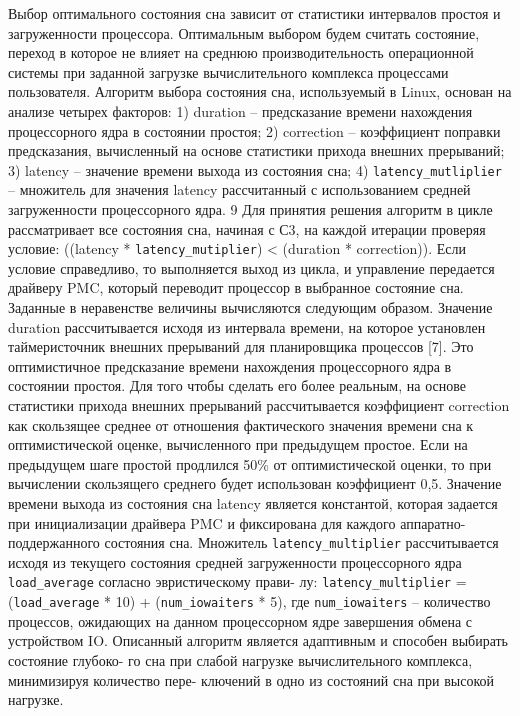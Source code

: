 \documentclass{article}
\begin{document}
Выбор оптимального состояния сна зависит от статистики интервалов простоя и загруженности процессора. Оптимальным выбором будем считать состояние, переход в которое не влияет на среднюю производительность операционной системы при заданной загрузке вычислительного комплекса процессами пользователя.
Алгоритм выбора состояния сна, используемый в Linux, основан на анализе четырех
факторов:
1) duration – предсказание времени нахождения процессорного ядра в состоянии
простоя;
2) correction – коэффициент поправки предсказания, вычисленный на основе статистики прихода внешних прерываний;
3) latency – значение времени выхода из состояния сна;
4) \texttt{latency\_mutliplier} – множитель для значения latency рассчитанный с использованием средней загруженности процессорного ядра.
9
Для принятия решения алгоритм в цикле рассматривает все состояния сна, начиная с
С3, на каждой итерации проверяя условие:
((latency * \texttt{latency\_mutiplier}) < (duration * correction)).
Если условие справедливо, то выполняется выход из цикла, и управление передается
драйверу PMC, который переводит процессор в выбранное состояние сна.
Заданные в неравенстве величины вычисляются следующим образом. Значение
duration рассчитывается исходя из интервала времени, на которое установлен таймеристочник внешних прерываний для планировщика процессов [7]. Это оптимистичное
предсказание времени нахождения процессорного ядра в состоянии простоя. Для того
чтобы сделать его более реальным, на основе статистики прихода внешних прерываний
рассчитывается коэффициент correction как скользящее среднее от отношения фактического значения времени сна к оптимистической оценке, вычисленного при предыдущем
простое. Если на предыдущем шаге простой продлился 50\% от оптимистической оценки,
то при вычислении скользящего среднего будет использован коэффициент 0,5. Значение
времени выхода из состояния сна latency является константой, которая задается при инициализации драйвера PMC и фиксирована для каждого аппаратно-поддержанного состояния сна. Множитель \texttt{latency\_multiplier} рассчитывается исходя из текущего состояния
средней загруженности процессорного ядра \texttt{load\_average} согласно эвристическому прави-
лу:
\texttt{latency\_multiplier} = (\texttt{load\_average} * 10) + (\texttt{num\_iowaiters} * 5),
где \texttt{num\_iowaiters} – количество процессов, ожидающих на данном процессорном ядре завершения обмена с устройством IO.
Описанный алгоритм является адаптивным и способен выбирать состояние глубоко-
го сна при слабой нагрузке вычислительного комплекса, минимизируя количество пере-
ключений в одно из состояний сна при высокой нагрузке.
\end{document}
